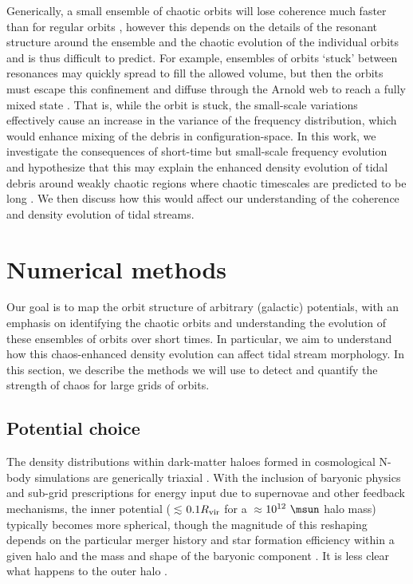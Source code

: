 Generically, a small ensemble of chaotic orbits will lose coherence much faster than for regular orbits \cite[see, e.g.,][]{kandrup94, merritt96, kandrup03}, however this depends on the details of the resonant structure around the ensemble and the chaotic evolution of the individual orbits and is thus difficult to predict. For example, ensembles of orbits `stuck' between resonances may quickly spread to fill the allowed volume, but then the orbits must escape this confinement and diffuse through the Arnold web to reach a fully mixed state \citep{merritt96}. That is, while the orbit is stuck, the small-scale variations effectively cause an increase in the variance of the frequency distribution, which would enhance mixing of the debris in configuration-space. In this work, we investigate the consequences of short-time but small-scale frequency evolution and hypothesize that this may explain the enhanced density evolution of tidal debris around weakly chaotic regions where chaotic timescales are predicted to be long \citep[e.g.,][]{pearson15}. We then discuss how this would affect our understanding of the coherence and density evolution of tidal streams.

\section{Numerical methods}\label{sec:methods}

Our goal is to map the orbit structure of arbitrary (galactic) potentials, with an emphasis on identifying the chaotic orbits and understanding the evolution of these ensembles of orbits over short times. In particular, we aim to understand how this chaos-enhanced density evolution can affect tidal stream morphology. In this section, we describe the methods we will use to detect and quantify the strength of chaos for large grids of orbits.

\subsection{Potential choice}\label{sec:potential}

The density distributions within dark-matter haloes formed in cosmological N-body simulations are generically triaxial \citep[e.g.,][]{jing02, bett07, zemp09, veraciro11}. With the inclusion of baryonic physics and sub-grid prescriptions for energy input due to supernovae and other feedback mechanisms, the inner potential ($\lesssim$$0.1R_{\rm vir}$ for a $\approx$$10^{12}~\msun$ halo mass) typically becomes more spherical, though the magnitude of this reshaping depends on the particular merger history and star formation efficiency within a given halo and the mass and shape of the baryonic component \citep[e.g.,][though in Milky Way-like galaxies, baryonic disks will add non-sphericity to the total potential]{dubinski94,kazantzidis04, debattista08, bryan13, butsky15}. It is less clear what happens to the outer halo \citep[e.g.,][]{zemp11, valluri13}.

